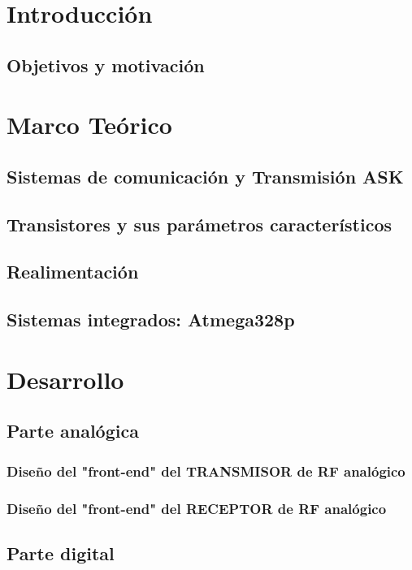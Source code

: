 \documentclass[11pt, a4paper]{article} %
\begin{document}
\newpage


\section{Introducción}
   
   \subsection{Objetivos y motivaci\'on}
   
\section{Marco Teórico}
   \subsection{Sistemas de comunicaci\'on y Transmisión ASK}
   
   \subsection{Transistores y sus parámetros característicos}
   \label{sec:teo_transistor}
   
   \subsection{Realimentaci\'on}
   
   \subsection{Sistemas integrados: Atmega328p}
   
\section{Desarrollo}
   
   \subsection{Parte anal\'ogica}
   
   \subsubsection{Diseño del "front-end" del TRANSMISOR de RF anal\'ogico}
   
   \subsubsection{Diseño del "front-end" del RECEPTOR de RF anal\'ogico}
   
   \subsection{Parte digital}
   
\end{document}
